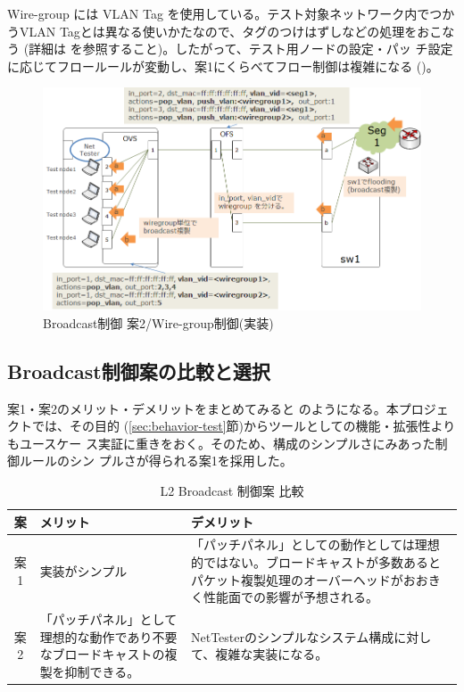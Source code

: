 Wire-group には VLAN Tag を使用している。テスト対象ネットワーク内でつか
うVLAN Tagとは異なる使いかたなので、タグのつけはずしなどの処理をおこなう
(詳細は \lopjtech を参照すること)。したがって、テスト用ノードの設定・パッ
チ設定に応じてフロールールが変動し、案1にくらべてフロー制御は複雑になる
()。

\begin{figure}[h]
 \centering
 \includegraphics[scale=0.6]{img/l2bcctrl_plan2_implement.png}
 \caption{Broadcast制御 案2/Wire-group制御(実装)}
 \label{fig:l2bcctrl_plan2_implement}
\end{figure}

  \subsection{Broadcast制御案の比較と選択}
  \label{sec:l2bcctrl-compare}

案1・案2のメリット・デメリットをまとめてみると
のようになる。本プロジェクトでは、その目的
(\ref{sec:behavior-test}節)からツールとしての機能・拡張性よりもユースケー
ス実証に重きをおく。そのため、構成のシンプルさにみあった制御ルールのシン
プルさが得られる案1を採用した。

\begin{table}[h]
 \caption{L2 Broadcast 制御案 比較}
 \label{tab:l2bcctrl_compare}
 \centering
 \begin{tabularx}{\linewidth}{c|X|X}
  \hline
  案 & メリット & デメリット \\ \hline
  \hline
  案1 & 実装がシンプル
      & 「パッチパネル」としての動作としては理想的ではない。ブロードキャストが多数あるとパケット複製処理のオーバーヘッドがおおきく性能面での影響が予想される。 \\ \hline
  案2 & 「パッチパネル」として理想的な動作であり不要なブロードキャストの複製を抑制できる。
      & NetTesterのシンプルなシステム構成に対して、複雑な実装になる。\\ \hline
 \end{tabularx}
 \end{table}

